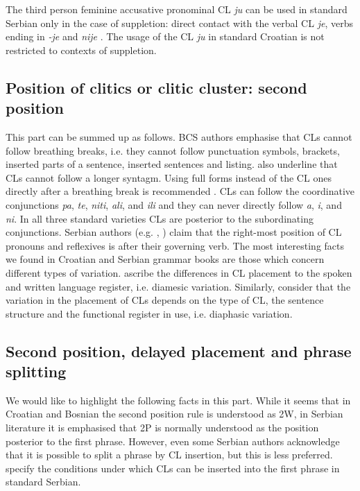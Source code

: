 The third person feminine accusative pronominal CL \textit{ju} can be used in standard Serbian only in the case of suppletion: direct contact with the verbal CL \textit{je}, verbs ending in \textit{-je} and \textit{nije} \citep[cf.][97]{PiperKlajn14}. The usage of the CL \textit{ju} in standard Croatian is not restricted to contexts of suppletion.  

\subsection{Position of clitics or clitic cluster: second position}

This part can be summed up as follows. BCS authors emphasise that CLs cannot follow breathing breaks, i.e. they cannot follow punctuation symbols, brackets, inserted parts of a sentence, inserted sentences and listing. \citet[246]{TezakBabic96} also underline that CLs cannot follow a longer syntagm. Using full forms instead of the CL ones directly after a breathing break is recommended  \citep[cf.][105]{PiperIvic05}. CLs can follow the coordinative conjunctions \textit{pa}, \textit{te}, \textit{niti}, \textit{ali}, and \textit{ili} and they can never directly follow \textit{a}, \textit{i}, and \textit{ni}. In all three standard varieties CLs are posterior to the subordinating conjunctions. Serbian authors (e.g. \citealt[450]{PiperKlajn14}, \citealt[371]{StanojcicPopovic02}) claim that the right-most position of CL pronouns and reflexives is after their governing verb. 
The most interesting facts we found in Croatian and Serbian grammar books are those which concern different types of variation. \citet[374]{SilicPranjkovic07} ascribe the differences in CL placement to the spoken and written language register, i.e. diamesic variation. Similarly, \citet[452]{PiperKlajn14} consider that the variation in the placement of CLs depends on the type of CL, the sentence structure and the functional register in use, i.e. diaphasic variation. 

\subsection{Second position, delayed placement and phrase splitting}

We would like to highlight the following facts in this part. While it seems that in Croatian and Bosnian the second position rule is understood as 2W, in Serbian literature it is emphasised that 2P is normally understood as the position posterior to the first phrase. However, even some Serbian authors acknowledge that it is possible to split a phrase by CL insertion, but this is less preferred. \citet[450]{PiperKlajn14} specify the conditions under which CLs can be inserted into the first phrase in standard Serbian. 

